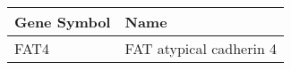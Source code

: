 \begin{tabular}{ll}
\toprule
Gene Symbol &                    Name \\
\midrule
       FAT4 & FAT atypical cadherin 4 \\
\bottomrule
\end{tabular}
